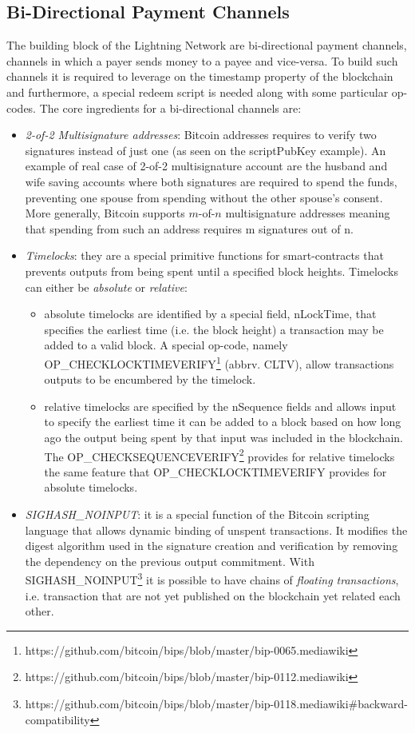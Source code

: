 		\subsection{Bi-Directional Payment Channels}
		
		The building block of the Lightning Network are bi-directional payment channels, channels in which a payer sends money to a payee and vice-versa. To build such channels it is required to leverage on the timestamp property of the blockchain and furthermore, a special redeem script is needed along with some particular op-codes. The core ingredients for a bi-directional channels are:
		\begin{itemize}
			\item \textit{2-of-2 Multisignature addresses}: Bitcoin addresses requires to verify two signatures instead of just one (as seen on the scriptPubKey example). An example of real case of 2-of-2 multisignature account are the husband and wife saving accounts where both signatures are required to spend the funds, preventing one spouse from spending without the other spouse's consent. More generally, Bitcoin supports $m$-of-$n$ multisignature addresses meaning that spending from such an address requires m signatures out of n.
			
			\item \textit{Timelocks}: they are a special primitive functions for smart-contracts that prevents outputs from being spent until a specified block heights. Timelocks can either be \textit{absolute} or \textit{relative}:
			\begin{itemize}
				\item absolute timelocks are identified by a special field, nLockTime, that specifies the earliest time (i.e. the block height) a transaction may be added to a valid block. A special op-code, namely OP\_CHECKLOCKTIMEVERIFY\footnote{https://github.com/bitcoin/bips/blob/master/bip-0065.mediawiki} (abbrv. CLTV), allow transactions outputs to be encumbered by the timelock. 
				
				\item relative timelocks are specified by the nSequence fields and allows input to specify the earliest time it can be added to a block based on how long ago the output being spent by that input was included in the blockchain. The OP\_CHECKSEQUENCEVERIFY\footnote{https://github.com/bitcoin/bips/blob/master/bip-0112.mediawiki} provides for relative timelocks the same feature that OP\_CHECKLOCKTIMEVERIFY provides for absolute timelocks.
			\end{itemize}	
			
			\item \textit{SIGHASH\_NOINPUT}: it is a special function of the Bitcoin scripting language that allows dynamic binding of unspent transactions. It modifies the digest algorithm used in the signature creation and verification by removing the dependency on the previous output commitment. With SIGHASH\_NOINPUT\footnote{https://github.com/bitcoin/bips/blob/master/bip-0118.mediawiki\#backward-compatibility} it is possible to have chains of \textit{floating transactions}, i.e. transaction that are not yet published on the blockchain yet related each other.
		\end{itemize}
		
